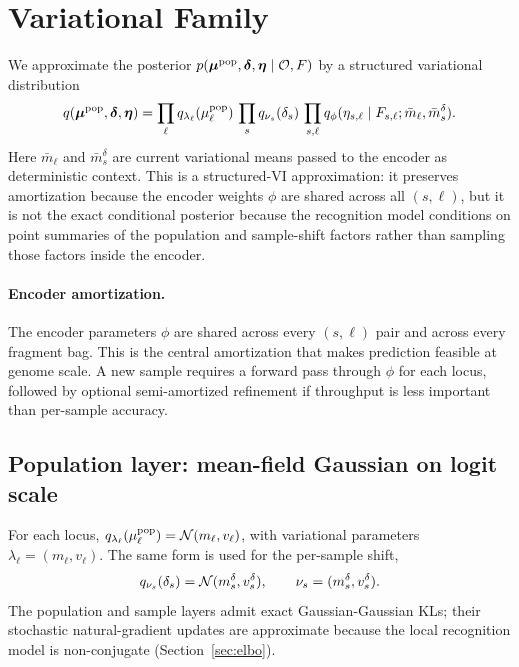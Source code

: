 \section{Variational Family}
\label{sec:varfamily}

We approximate the posterior $p(\bm{\mu}^{\mathrm{pop}},\boldsymbol{\delta},\bm\eta\mid \mathcal{O},F)$ by a structured variational distribution
\begin{equation}
q(\bm{\mu}^{\mathrm{pop}},\boldsymbol{\delta},\bm\eta) = \prod_\ell q_{\lambda_\ell}(\mu^{\mathrm{pop}}_\ell)\,\prod_s q_{\nu_s}(\delta_s)\,\prod_{s,\ell} q_\phi(\eta_{s,\ell}\mid F_{s,\ell}; \bar m_\ell, \bar m_s^\delta).
\label{eq:varfamily}
\end{equation}
Here $\bar m_\ell$ and $\bar m_s^\delta$ are current variational means passed to the encoder as deterministic context. This is a structured-VI approximation: it preserves amortization because the encoder weights $\phi$ are shared across all $(s,\ell)$, but it is not the exact conditional posterior because the recognition model conditions on point summaries of the population and sample-shift factors rather than sampling those factors inside the encoder.

\paragraph{Encoder amortization.} The encoder parameters $\phi$ are shared across every $(s,\ell)$ pair and across every fragment bag. This is the central amortization that makes prediction feasible at genome scale. A new sample requires a forward pass through $\phi$ for each locus, followed by optional semi-amortized refinement if throughput is less important than per-sample accuracy.

\subsection{Population layer: mean-field Gaussian on logit scale}
For each locus, $q_{\lambda_\ell}(\mu^{\mathrm{pop}}_\ell)=\mathcal{N}(m_\ell,v_\ell)$, with variational parameters $\lambda_\ell=(m_\ell,v_\ell)$. The same form is used for the per-sample shift,
\begin{equation}
q_{\nu_s}(\delta_s)=\mathcal{N}(m_s^\delta,v_s^\delta), \qquad \nu_s=(m_s^\delta,v_s^\delta).
\end{equation}
The population and sample layers admit exact Gaussian-Gaussian KLs; their stochastic natural-gradient updates are approximate because the local recognition model is non-conjugate (Section~\ref{sec:elbo}).

